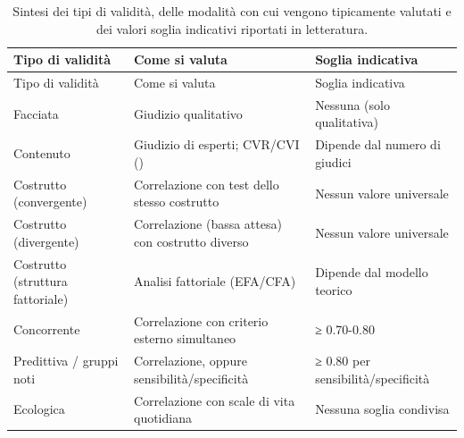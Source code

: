 \documentclass[
  italian,
  letterpaper,
  paper=A4,
  headinclude=on,
  footinclude=on,
  12pt]{scrbook}
\begin{document}
\begin{longtable}[]{@{}
  >{\raggedright\arraybackslash}p{}
  >{\raggedright\arraybackslash}p{}
  >{\raggedright\arraybackslash}p{}@{}}
\caption{Sintesi dei tipi di validità, delle modalità con cui vengono
tipicamente valutati e dei valori soglia indicativi riportati in
letteratura.}\label{tbl-validita}\tabularnewline
\toprule\noalign{}
\begin{minipage}[b]{\linewidth}\raggedright
Tipo di validità
\end{minipage} & \begin{minipage}[b]{\linewidth}\raggedright
Come si valuta
\end{minipage} & \begin{minipage}[b]{\linewidth}\raggedright
Soglia indicativa
\end{minipage} \\
\midrule\noalign{}
\endfirsthead
\toprule\noalign{}
\begin{minipage}[b]{\linewidth}\raggedright
Tipo di validità
\end{minipage} & \begin{minipage}[b]{\linewidth}\raggedright
Come si valuta
\end{minipage} & \begin{minipage}[b]{\linewidth}\raggedright
Soglia indicativa
\end{minipage} \\
\midrule\noalign{}
\endhead
\bottomrule\noalign{}
\endlastfoot
Facciata & Giudizio qualitativo & Nessuna (solo qualitativa) \\
Contenuto & Giudizio di esperti; CVR/CVI (\cite{lawshe1975quantitative})
& Dipende dal numero di giudici \\
Costrutto (convergente) & Correlazione con test dello stesso costrutto &
Nessun valore universale \\
Costrutto (divergente) & Correlazione (bassa attesa) con costrutto
diverso & Nessun valore universale \\
Costrutto (struttura fattoriale) & Analisi fattoriale (EFA/CFA) &
Dipende dal modello teorico \\
Concorrente & Correlazione con criterio esterno simultaneo & ≥
0.70-0.80 \\
Predittiva / gruppi noti & Correlazione, oppure sensibilità/specificità
& ≥ 0.80 per sensibilità/specificità \\
Ecologica & Correlazione con scale di vita quotidiana & Nessuna soglia
condivisa \\
\end{longtable}
\end{document}
